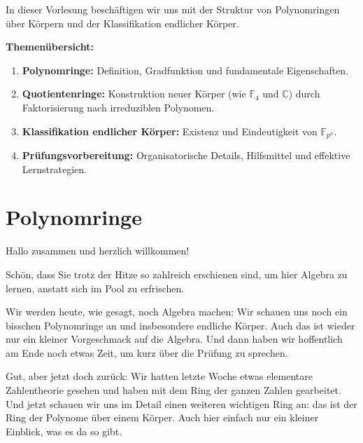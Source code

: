 

\begin{nice-box}
In dieser Vorlesung beschäftigen wir uns mit der Struktur von Polynomringen über Körpern und der Klassifikation endlicher Körper.

\textbf{Themenübersicht:}
\begin{enumerate}[label=\textbf{(\arabic*)}]
    \item \textbf{Polynomringe:} Definition, Gradfunktion und fundamentale Eigenschaften.
    \item \textbf{Quotientenringe:} Konstruktion neuer Körper (wie $\mathbb{F}_4$ und $\mathbb{C}$) durch Faktorisierung nach irreduziblen Polynomen.
    \item \textbf{Klassifikation endlicher Körper:} Existenz und Eindeutigkeit von $\mathbb{F}_{p^n}$.
    \item \textbf{Prüfungsvorbereitung:} Organisatorische Details, Hilfsmittel und effektive Lernstrategien.
\end{enumerate}
\end{nice-box}

\section{Polynomringe}

\begin{spoken-clean}[00:00:00 - 00:01:50]
Hallo zusammen und herzlich willkommen!

Schön, dass Sie trotz der Hitze so zahlreich erschienen sind, um hier Algebra zu lernen, anstatt sich im Pool zu erfrischen.

Wir werden heute, wie gesagt, noch Algebra machen: Wir schauen uns noch ein bisschen Polynomringe an und insbesondere endliche Körper. Auch das ist wieder nur ein kleiner Vorgeschmack auf die Algebra. Und dann haben wir hoffentlich am Ende noch etwas Zeit, um kurz über die Prüfung zu sprechen.

Gut, aber jetzt doch zurück: Wir hatten letzte Woche etwas elementare Zahlentheorie gesehen und haben mit dem Ring der ganzen Zahlen gearbeitet. Und jetzt schauen wir uns im Detail einen weiteren wichtigen Ring an: das ist der Ring der Polynome über einem Körper. Auch hier einfach nur ein kleiner Einblick, was es da so gibt.
\end{spoken-clean}

